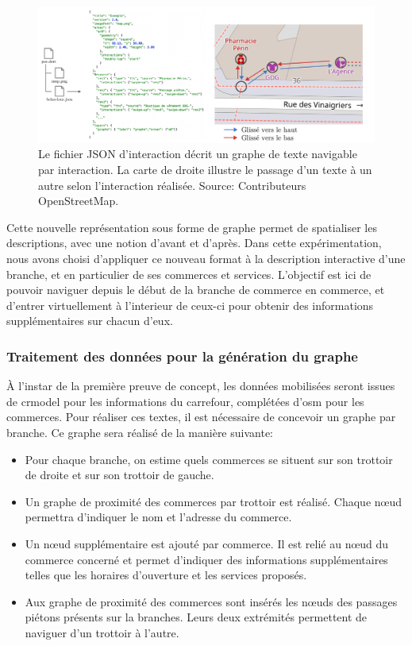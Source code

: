 \begin{figure}[ht]
    \centering
    \includegraphics[width=\textwidth]{images/experimentation/exemple_deri2.pdf}
    \caption[Exemple de fichier DERi 2]{Le fichier JSON d’interaction décrit un graphe de texte navigable par interaction. La carte de droite illustre le passage d'un texte à un autre selon l'interaction réalisée. Source: Contributeurs OpenStreetMap.}
    \label{fig:experimentation_deri2_exemple}
\end{figure}

Cette nouvelle représentation sous forme de graphe permet de spatialiser les descriptions, avec une notion d'avant et d'après. Dans cette expérimentation, nous avons choisi d'appliquer ce nouveau format  à la description interactive d'une branche, et en particulier de ses commerces et services. L'objectif est ici de pouvoir naviguer depuis le début de la branche de commerce en commerce, et d'entrer virtuellement à l'interieur de ceux-ci pour obtenir des informations supplémentaires sur chacun d'eux. 

\subsubsection{Traitement des données pour la génération du graphe}

À l'instar de la première preuve de concept, les données mobilisées seront issues de crmodel pour les informations du carrefour, complétées d'\gls{osm} pour les commerces. Pour réaliser ces textes, il est nécessaire de concevoir un graphe par branche. Ce graphe sera réalisé de la manière suivante:

\begin{itemize}
    \item Pour chaque branche, on estime quels commerces se situent sur son trottoir de droite et sur son trottoir de gauche.
    \item Un graphe de proximité des commerces par trottoir est réalisé. Chaque nœud permettra d'indiquer le nom et l'adresse du commerce.
    \item Un nœud supplémentaire est ajouté par commerce. Il est relié au nœud du commerce concerné et permet d'indiquer des informations supplémentaires telles que les horaires d'ouverture et les services proposés.
    \item Aux graphe de proximité des commerces sont insérés les nœuds des passages piétons présents sur la branches. Leurs deux extrémités permettent de naviguer d'un trottoir à l'autre.
\end{itemize}

